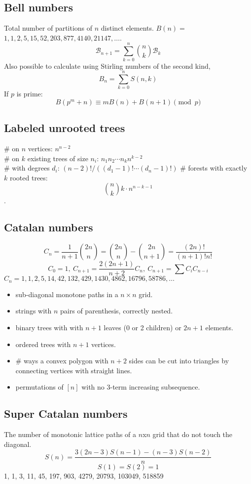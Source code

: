 \subsection{Bell numbers}
	Total number of partitions of $n$ distinct elements. $B(n) =$
	$1, 1, 2, 5, 15, 52, 203, 877, 4140, 21147, \dots$. 
	\begin{equation*}
    \mathcal{B}_{n+1} = \sum_{k=0}^n \binom{n}{k} \mathcal{B}_k
  \end{equation*}
  Also possible to calculate using Stirling numbers of the second kind,
  \[B_n = \sum_{k = 0}^{n} S(n, k)\]
  If $p$ is prime:
	\[ B(p^m+n)\equiv mB(n)+B(n+1) \pmod{p} \]

\subsection{Labeled unrooted trees}
	\# on $n$ vertices: $n^{n-2}$ \\
	\# on $k$ existing trees of size $n_i$: $n_1n_2\cdots n_k n^{k-2}$\\
	\# with degrees $d_i$: $(n-2)! / ((d_1-1)! \cdots (d_n-1)!)$
	\# forests with exactly $k$ rooted trees: $$\binom{n}{k} k \cdot n^{n-k-1}$$.

\subsection{Catalan numbers}
	\[ C_n=\frac{1}{n+1}\binom{2n}{n}= \binom{2n}{n}-\binom{2n}{n+1} = \frac{(2n)!}{(n+1)!n!} \]
	\[ C_0=1,\ C_{n+1} = \frac{2(2n+1)}{n+2}C_n,\ C_{n+1}=\sum C_iC_{n-i} \]
	${C_n = 1, 1, 2, 5, 14, 42, 132, 429, 1430, 4862, 16796, 58786, \dots}$
	\begin{itemize}[noitemsep]
		\item sub-diagonal monotone paths in a $n\times n$ grid.
		\item strings with $n$ pairs of parenthesis, correctly nested.
		\item binary trees with with $n+1$ leaves (0 or 2 children) or $2n + 1$ elements.
		\item ordered trees with $n+1$ vertices.
		\item \# ways a convex polygon with $n+2$ sides can be cut into triangles by connecting vertices with straight lines.
		\item permutations of $[n]$ with no 3-term increasing subsequence.
	\end{itemize}

\subsection{Super Catalan numbers}
The number of monotonic lattice paths of a $n$x$n$ grid that do not touch the diagonal.\\
$$S(n) = \frac{3(2n-3)S(n-1)-(n-3)S(n-2)}{n}$$
$$S(1) = S(2) = 1$$
1, 1, 3, 11, 45, 197, 903, 4279, 20793, 103049, 518859\\

